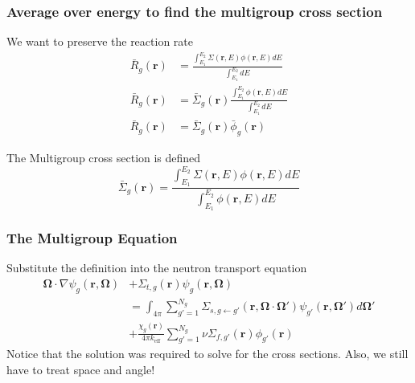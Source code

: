 \documentclass[fleqn]{beamer}
\renewcommand{\vec}[1]{\ensuremath{\bm{#1}}}
\begin{document}
    \begin{frame}
        \frametitle{Average over energy to find the multigroup cross section}

        \begin{block}{We want to preserve the reaction rate}
            \begin{align*}
                \bar{R}_{g}(\vec{r}) &= \frac{\int_{E_1}^{E_2}\Sigma(\vec{r}, E)\phi(\vec{r},E)dE}{\int_{E_1}^{E_2}dE}\\
                \bar{R}_{g}(\vec{r}) &= \bar{\Sigma}_{g}(\vec{r})\frac{\int_{E_1}^{E_2}\phi(\vec{r},E)dE}{\int_{E_1}^{E_2}dE}\\
                \bar{R}_{g}(\vec{r}) &= \bar{\Sigma}_{g}(\vec{r})\bar{\phi}_{g}(\vec{r})
            \end{align*}
        \end{block}

        \begin{block}{The Multigroup cross section is defined}
            \begin{equation*}
                \bar{\Sigma}_g(\vec{r}) = \frac{\int_{E_1}^{E_2}\Sigma(\vec{r},E)\phi(\vec{r},E)dE}{\int_{E_1}^{E_2}\phi(\vec{r},E)dE}
            \end{equation*}
        \end{block}
    \end{frame}

    \begin{frame}
        \frametitle{The Multigroup Equation}
        \centering
        \begin{block}{Substitute the definition into the neutron transport equation}
            \begin{align*}
                \vec{\Omega}\cdot\nabla\psi_g(\vec{r},\vec{\Omega})
                &+\Sigma_{t,g}(\vec{r})\psi_g(\vec{r},\vec{\Omega})\\
                &=\int_{4\pi}\sum_{g'=1}^{N_g}\Sigma_{s,g\leftarrow g'}(\vec{r},\vec{\Omega}\cdot\vec{\Omega}')\psi_{g'}(\vec{r},\vec{\Omega'})d\vec{\Omega}'\\
                &+\frac{\chi_g(\vec{r})}{4\pi k_{\text{eff}}}\sum_{g'=1}^{N_g}\nu\Sigma_{f,g'}(\vec{r})\phi_{g'}(\vec{r})
            \end{align*}
            Notice that the solution was required to solve for the cross sections.
            Also, we still have to treat space and angle!
        \end{block}
    \end{frame}
\end{document}
